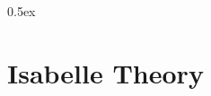 \documentclass[a4paper,enabledeprecatedfontcommands]{scrreprt}
\numberwithin{remark}{chapter}
\numberwithin{TODO}{chapter}
\begin{document}
\tableofcontents

\parindent 0pt\parskip 0.5ex




\appendix
\chapter{Isabelle Theory}













\restoregeometry



\end{document}

